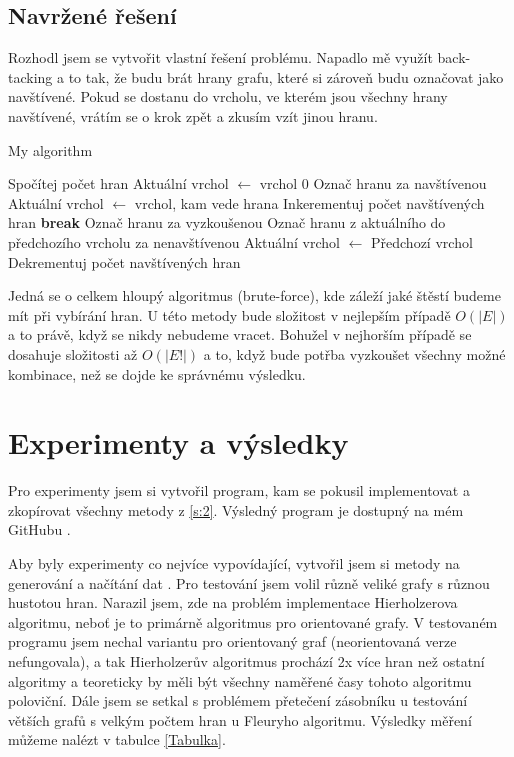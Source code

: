 \documentclass[12pt, a4paper]{article}
\newcommand{\Break}{\State \textbf{break} }
\begin{document}
\subsection{Navržené řešení}
Rozhodl jsem se vytvořit vlastní řešení problému. Napadlo mě využít back-tacking a to tak, že budu brát hrany grafu, které si zároveň budu označovat jako navštívené. Pokud se dostanu do vrcholu, ve kterém jsou všechny hrany navštívené, vrátím se o krok zpět a zkusím vzít jinou hranu.
\begin{algorithm}
\caption{My algorithm}\label{euclid}
\begin{algorithmic} [1]
\State Spočítej počet hran
\State Aktuální vrchol $\gets$ vrchol 0
			\State Označ hranu za navštívenou
			\State Aktuální vrchol $\gets$ vrchol, kam vede hrana
			\State Inkerementuj počet navštívených hran 
			\Break
		\Else
			\State Označ hranu za vyzkoušenou
		\EndIf 
	\EndWhile
		\State Označ hranu z aktuálního do předchozího vrcholu za nenavštívenou
		\State Aktuální vrchol $\gets$ Předchozí vrchol
		\State Dekrementuj počet navštívených hran
	\EndIf 
\EndWhile 
\end{algorithmic}
\end{algorithm}

Jedná se o celkem hloupý algoritmus (brute-force), kde záleží jaké štěstí budeme mít při vybírání hran. U této metody bude složitost v nejlepším případě $O(|E|)$ a to právě, když se nikdy nebudeme vracet. Bohužel v nejhorším případě se dosahuje složitosti až $O(|E!|)$ a to, když bude potřba vyzkoušet všechny možné kombinace, než se dojde ke správnému výsledku.

\section{Experimenty a výsledky}
Pro experimenty jsem si vytvořil program, kam se pokusil implementovat a zkopírovat všechny metody z \ref{s:2}. Výsledný program je dostupný na mém GitHubu \cite{ReseniMoje}.

Aby byly experimenty co nejvíce vypovídající, vytvořil jsem si metody na generování a načítání dat . Pro testování jsem volil různě veliké grafy s různou hustotou hran. Narazil jsem, zde na problém implementace Hierholzerova algoritmu, neboť je to primárně algoritmus pro orientované grafy. V testovaném programu jsem nechal variantu pro orientovaný graf (neorientovaná verze nefungovala), a tak Hierholzerův algoritmus prochází 2x více hran než ostatní algoritmy a teoreticky by měli být všechny naměřené časy tohoto algoritmu poloviční. Dále jsem se setkal s problémem přetečení zásobníku u testování větších grafů s velkým počtem hran u Fleuryho algoritmu. Výsledky měření můžeme nalézt v tabulce \ref{Tabulka}.
\end{document}
